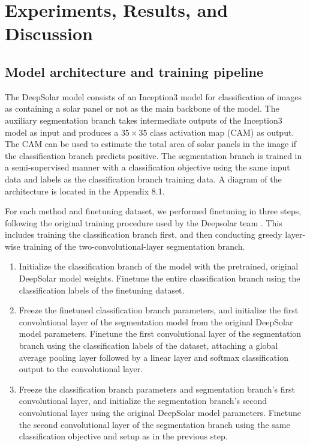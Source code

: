 \documentclass[10pt,twocolumn,letterpaper]{article}
\begin{document}
\section{Experiments, Results, and Discussion}
\subsection{Model architecture and training pipeline}
The DeepSolar model \cite{DeepSolar1} consists of an Inception3 model for classification of images as containing a solar panel or not as the main backbone of the model. The auxiliary segmentation branch takes intermediate outputs of the Inception3 model as input and produces a $35 \times 35$ class activation map (CAM) as output. The CAM can be used to estimate the total area of solar panels in the image if the classification branch predicts positive. The segmentation branch is trained in a semi-supervised manner with a classification objective using the same input data and labels as the classification branch training data. A diagram of the architecture is located in the Appendix 8.1.

For each method and finetuning dataset, we performed finetuning in three steps, following the original training procedure used by the Deepsolar team \cite{DeepSolar1}. This includes training the classification branch first, and then conducting greedy layer-wise training of the two-convolutional-layer segmentation branch.

\begin{enumerate}
\item Initialize the classification branch of the model with the pretrained, original DeepSolar model weights. Finetune the entire classification branch using the classification labels of the finetuning dataset.
\item Freeze the finetuned classification branch parameters, and initialize the first convolutional layer of the segmentation model from the original DeepSolar model parameters. Finetune the first convolutional layer of the segmentation branch using the classification labels of the dataset, attaching a global average pooling layer followed by a linear layer and softmax classification output to the convolutional layer. 
\item Freeze the classification branch parameters and segmentation branch's first convolutional layer, and initialize the segmentation branch's second convolutional layer using the original DeepSolar model parameters. Finetune the second convolutional layer of the segmentation branch using the same classification objective and setup as in the previous step.
\end{enumerate}
\end{document}
